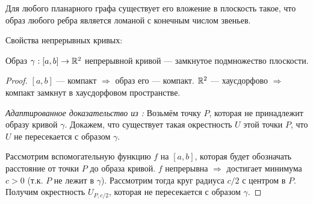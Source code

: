 \begin{theorem}[$\bigstar$]
    Для любого планарного графа существует его вложение в плоскость такое, что образ любого ребра является ломаной с конечным числом звеньев.
\end{theorem}

Свойства непрерывных кривых:

\begin{lemma}
    Образ $\gamma: [a,b] \to \mathbb{R}^2$ непрерывной кривой — замкнутое подмножество плоскости.
\end{lemma}
\begin{proof}
    $\left[a,b\right]$ — компакт $\Rightarrow$ образ его — компакт. $\mathbb{R}^2$ — хаусдорфово $\Rightarrow$ компакт замкнут в хаусдорфовом пространстве.

    \noindent \textit{Адаптированное доказательство из \cite{oshemkov}:} Возьмём точку $P$, которая не принадлежит образу кривой $\gamma$. Докажем, что существует такая окрестность $U$ этой точки $P$, что $U$ не пересекается с образом $\gamma$.

    Рассмотрим вспомогательную функцию $f$ на $[a,b]$, которая будет обозначать расстояние от точки $P$ до образа кривой. $f$ непрерывна $\Rightarrow$ достигает минимума $c > 0$ (т.к. $P$ не лежит в $\gamma$). Рассмотрим тогда круг радиуса $c / 2$ с центром в $P$. Получим окрестность $U_{P, c/2}$, которая не пересекается с образом $\gamma$.
\end{proof}


